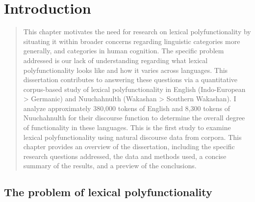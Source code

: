 \chapter{Introduction}
\label{ch:introduction}

\blockquote{This chapter motivates the need for research on lexical polyfunctionality by situating it within broader concerns regarding linguistic categories more generally, and categories in human cognition. The specific problem addressed is our lack of understanding regarding what lexical polyfunctionality looks like and how it varies across languages. This dissertation contributes to answering these questions via a quantitative corpus-based study of lexical polyfunctionality in English (Indo-European > Germanic) and Nuuchahnulth (Wakashan > Southern Wakashan). I analyze approximately 380,000 tokens of English and 8,300 tokens of Nuuchahnulth for their discourse function to determine the overall degree of functionality in these languages. This is the first study to examine lexical polyfunctionality using natural discourse data from corpora. This chapter provides an overview of the dissertation, including the specific research questions addressed, the data and methods used, a concise summary of the results, and a preview of the conclusions.}

\section{The problem of lexical polyfunctionality}
\label{sec:1.1}

